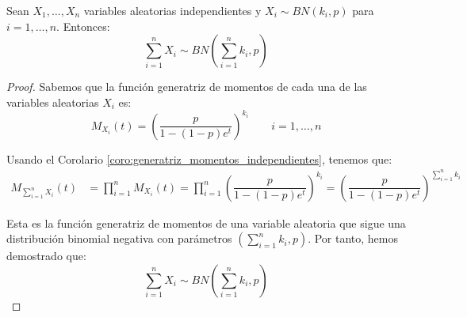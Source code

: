 \begin{prop}
    Sean $X_1, \dots, X_n$ variables aleatorias independientes y $X_i\sim BN(k_i, p)$ para $i=1,\dots,n$. Entonces:
    \begin{equation*}
        \sum_{i=1}^{n}X_i \sim BN\left(\sum_{i=1}^{n}k_i, p\right)
    \end{equation*}

    \begin{proof}
        Sabemos que la función generatriz de momentos de cada una de las variables aleatorias $X_i$ es:
        \begin{equation*}
            M_{X_i}(t) = \left(\dfrac{p}{1-(1-p)e^t}\right)^{k_i} \qquad i=1,\dots,n
        \end{equation*}

        Usando el Corolario \ref{coro:generatriz_momentos_independientes}, tenemos que:
        \begin{align*}
            M_{\sum\limits_{i=1}^{n}X_i}(t) &= \prod_{i=1}^{n}M_{X_i}(t) = \prod_{i=1}^{n}\left(\dfrac{p}{1-(1-p)e^t}\right)^{k_i} = \left(\dfrac{p}{1-(1-p)e^t}\right)^{\sum\limits_{i=1}^{n}k_i}
        \end{align*}

        Esta es la función generatriz de momentos de una variable aleatoria que sigue una distribución binomial negativa con parámetros $\left(\sum\limits_{i=1}^{n}k_i, p\right)$. Por tanto, hemos demostrado que:
        \begin{equation*}
            \sum_{i=1}^{n}X_i \sim BN\left(\sum_{i=1}^{n}k_i, p\right)
        \end{equation*}
    \end{proof}
\end{prop}


